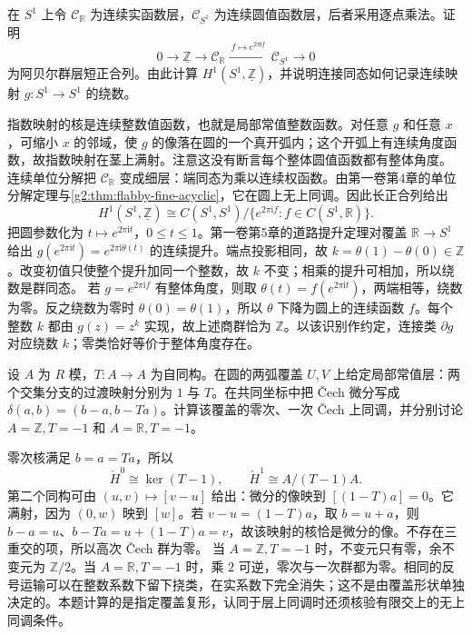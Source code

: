 \begin{exercise}\label{g2:ex:exponential-sheaf-circle}
	在 \(S^1\) 上令 \(\mathcal C_{\mathbb R}\) 为连续实函数层，\(\mathcal C_{S^1}\) 为连续圆值函数层，后者采用逐点乘法。证明
	\[
		0\longrightarrow\underline{\mathbb Z}\longrightarrow\mathcal C_{\mathbb R}\xrightarrow{\ f\mapsto e^{2\pi\mathrm i f}\ }\mathcal C_{S^1}\longrightarrow0
	\]
	为阿贝尔群层短正合列。由此计算 \(H^1(S^1,\underline{\mathbb Z})\)，并说明连接同态如何记录连续映射 \(g:S^1\to S^1\) 的绕数。
\end{exercise}
\begin{solution}
	指数映射的核是连续整数值函数，也就是局部常值整数函数。对任意 \(g\) 和任意 \(x\)，可缩小 \(x\) 的邻域，使 \(g\) 的像落在圆的一个真开弧内；这个开弧上有连续角度函数，故指数映射在茎上满射。注意这没有断言每个整体圆值函数都有整体角度。
	连续单位分解把 \(\mathcal C_{\mathbb R}\) 变成细层：端同态为乘以连续权函数。由第一卷第4章的单位分解定理与\cref{g2:thm:flabby-fine-acyclic}，它在圆上无上同调。因此长正合列给出
	\[
		H^1(S^1,\underline{\mathbb Z})\cong
		 C(S^1,S^1)/\{e^{2\pi\mathrm i f}:f\in C(S^1,\mathbb R)\}.
	\]
	把圆参数化为 \(t\mapsto e^{2\pi\mathrm it}\)，\(0\le t\le1\)。第一卷第5章的道路提升定理对覆盖 \(\mathbb R\to S^1\) 给出 \(g(e^{2\pi\mathrm it})=e^{2\pi\mathrm i\theta(t)}\) 的连续提升。端点投影相同，故 \(k=\theta(1)-\theta(0)\in\mathbb Z\)。改变初值只使整个提升加同一个整数，故 \(k\) 不变；相乘的提升可相加，所以绕数是群同态。
	若 \(g=e^{2\pi\mathrm if}\) 有整体角度，则取 \(\theta(t)=f(e^{2\pi\mathrm it})\)，两端相等，绕数为零。反之绕数为零时 \(\theta(0)=\theta(1)\)，所以 \(\theta\) 下降为圆上的连续函数 \(f\)。每个整数 \(k\) 都由 \(g(z)=z^k\) 实现，故上述商群恰为 \(\mathbb Z\)。以该识别作约定，连接类 \(\partial g\) 对应绕数 \(k\)；零类恰好等价于整体角度存在。
\end{solution}

\begin{exercise}\label{g2:ex:twisted-cech-circle}
	设 \(A\) 为 \(R\) 模，\(T:A\to A\) 为自同构。在圆的两弧覆盖 \(U,V\) 上给定局部常值层：两个交集分支的过渡映射分别为 \(1\) 与 \(T\)。在共同坐标中把 Čech 微分写成 \(\delta(a,b)=(b-a,b-Ta)\)。计算该覆盖的零次、一次 Čech 上同调，并分别讨论 \(A=\mathbb Z,T=-1\) 和 \(A=\mathbb R,T=-1\)。
\end{exercise}
\begin{solution}
	零次核满足 \(b=a=Ta\)，所以
	\[
		\check H^0\cong\ker(T-1),\qquad
		\check H^1\cong A/(T-1)A.
	\]
	第二个同构可由 \((u,v)\mapsto[v-u]\) 给出：微分的像映到 \([(1-T)a]=0\)。它满射，因为 \((0,w)\) 映到 \([w]\)。若 \(v-u=(1-T)a\)，取 \(b=u+a\)，则 \(b-a=u\)、\(b-Ta=u+(1-T)a=v\)，故该映射的核恰是微分的像。不存在三重交的项，所以高次 Čech 群为零。
	当 \(A=\mathbb Z,T=-1\) 时，不变元只有零，余不变元为 \(\mathbb Z/2\)。当 \(A=\mathbb R,T=-1\) 时，乘 \(2\) 可逆，零次与一次群都为零。相同的反号运输可以在整数系数下留下挠类，在实系数下完全消失；这不是由覆盖形状单独决定的。本题计算的是指定覆盖复形，认同于层上同调时还须核验有限交上的无上同调条件。
\end{solution}

